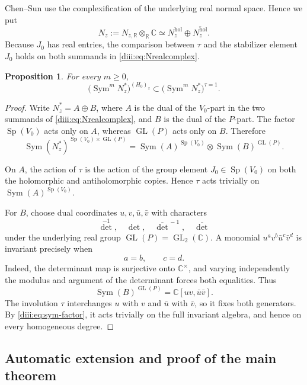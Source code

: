 \documentclass[10pt,a4paper]{amsart}
\numberwithin{equation}{section}
\newtheorem{proposition}[theorem]{Proposition}
\newcommand{\C}{\mathbb C}
\newcommand{\GL}{\operatorname{GL}}
\newcommand{\Sp}{\operatorname{Sp}}
\newcommand{\Sym}{\operatorname{Sym}}
\begin{document}
Chen--Sun use the complexification of the underlying real normal space.  Hence we put
\begin{equation}\label{diii:eq:Nrealcomplex}
  N_z:=N_{z,\mathbb R}\otimes_{\mathbb R}\C
  \simeq N_z^{\mathrm{hol}}\oplus\overline{N_z^{\mathrm{hol}}}.
\end{equation}
Because $J_0$ has real entries, the comparison between $\tau$ and the stabilizer element $J_0$ holds on both summands in \eqref{diii:eq:Nrealcomplex}.

\begin{proposition}\label{diii:prop:normal-parity}
For every $m\ge0$,
\begin{equation}\label{diii:eq:normal-even}
  \bigl(\Sym^mN_z^*\bigr)^{(H_0)_z}
  \subset
  \bigl(\Sym^mN_z^*\bigr)^{\tau=1}.
\end{equation}
\end{proposition}

\begin{proof}
Write $N_z^*=A\oplus B$, where $A$ is the dual of the $V_0$-part in the two summands of \eqref{diii:eq:Nrealcomplex}, and $B$ is the dual of the $P$-part.  The factor $\Sp(V_0)$ acts only on $A$, whereas $\GL(P)$ acts only on $B$.  Therefore
\begin{equation}\label{diii:eq:sym-factor}
  \Sym(N_z^*)^{\Sp(V_0)\times\GL(P)}
  =\Sym(A)^{\Sp(V_0)}\otimes\Sym(B)^{\GL(P)}.
\end{equation}

On $A$, the action of $\tau$ is the action of the group element
$J_0\in\Sp(V_0)$ on both the holomorphic and antiholomorphic copies.  Hence $\tau$ acts trivially on $\Sym(A)^{\Sp(V_0)}$.

For $B$, choose dual coordinates $u,v,\bar u,\bar v$ with characters
\[
  \det^{-1},\quad\det,\quad\overline{\det}^{\,-1},\quad\overline{\det}
\]
under the underlying real group $\GL(P)=\GL_2(\C)$.  A monomial
$u^av^b\bar u^c\bar v^d$ is invariant precisely when
\[
  a=b,\qquad c=d.
\]
Indeed, the determinant map is surjective onto $\C^\times$, and varying independently the modulus and argument of the determinant forces both equalities.  Thus
\[
  \Sym(B)^{\GL(P)}=\C[uv,\bar u\bar v].
\]
The involution $\tau$ interchanges $u$ with $v$ and $\bar u$ with $\bar v$, so it fixes both generators.  By \eqref{diii:eq:sym-factor}, it acts trivially on the full invariant algebra, and hence on every homogeneous degree.
\end{proof}

\subsection{Automatic extension and proof of the main theorem}
\end{document}
